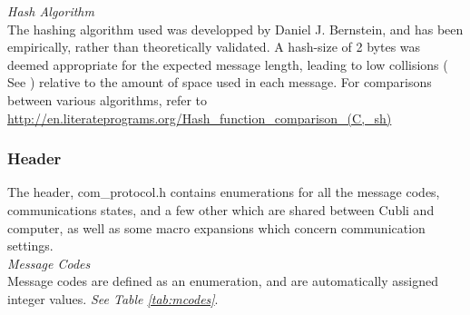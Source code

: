 \textit{Hash Algorithm}\\

The hashing algorithm used was developped by Daniel J. Bernstein, and has been empirically, rather than theoretically validated. A hash-size of 2 bytes was deemed appropriate for the expected message length, leading to low collisions ( See \cite{hashing} ) relative to the amount of space used in each message. For comparisons between various algorithms, refer to \url{http://en.literateprograms.org/Hash_function_comparison_(C,_sh)}

\subsubsection{Header}

The header, com\_protocol.h contains enumerations for all the message codes, communications states, and a few other which are shared between Cubli and computer, as well as some macro expansions which concern communication settings.\\

\textit{Message Codes}\\

Message codes are defined as an enumeration, and are automatically assigned integer values. \textit{See Table \ref{tab:mcodes}}.\\

